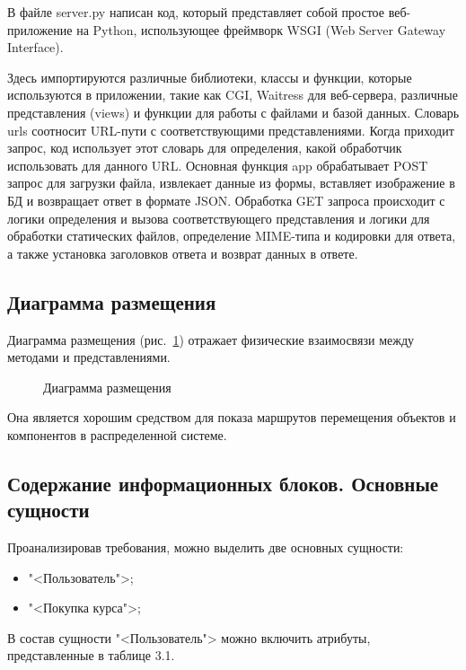 В файле server.py написан код, который представляет собой простое веб-приложение на Python, использующее фреймворк WSGI (Web Server Gateway Interface).

Здесь импортируются различные библиотеки, классы и функции, которые используются в приложении, такие как CGI, Waitress для веб-сервера, различные представления (views) и функции для работы с файлами и базой данных. Словарь urls соотносит URL-пути с соответствующими представлениями. Когда приходит запрос, код использует этот словарь для определения, какой обработчик использовать для данного URL. Основная функция app обрабатывает POST запрос для загрузки файла, извлекает данные из формы, вставляет изображение в БД и возвращает ответ в формате JSON. Обработка GET запроса происходит с логики определения и вызова соответствующего представления и логики для обработки статических файлов, определение MIME-типа и кодировки для ответа, а также установка заголовков ответа и возврат данных в ответе.

\subsection{Диаграмма размещения}

Диаграмма размещения (рис.~\ref{place:image}) отражает физические взаимосвязи между методами и представлениями.

\vspace{-8mm} %
\begin{figure}[ht]
\caption{Диаграмма размещения}
\label{place:image}
\end{figure}

Она является хорошим средством для показа маршрутов перемещения объектов и компонентов в распределенной системе.

\subsection{Содержание информационных блоков. Основные сущности}

Проанализировав требования, можно выделить две основных сущности:
\begin{itemize}
	\item "<Пользователь">;
	\item "<Покупка курса">;
\end{itemize}

В состав сущности "<Пользователь"> можно включить атрибуты, представленные в таблице 3.1.


